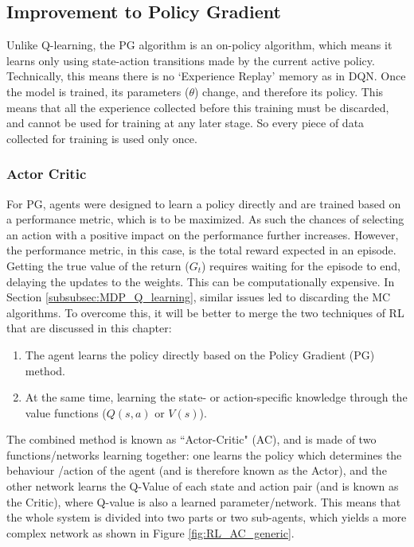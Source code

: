 \subsection{Improvement to Policy Gradient}

Unlike Q-learning, the PG algorithm is an on-policy algorithm, which means it learns only using state-action transitions made by the current active policy. Technically, this means there is no `Experience Replay' memory as in DQN. Once the model is trained, its parameters ($\theta$) change, and therefore its policy. This means that all the experience collected before this training must be discarded, and cannot be used for training at any later stage. So every piece of data collected for training is used only once.

\subsubsection{Actor Critic}
For PG, agents were designed to learn a policy directly and are trained based on a performance metric, which is to be maximized. As such the chances of selecting an action with a positive impact on the performance further increases. However, the performance metric, in this case, is the total reward expected in an episode. Getting the true value of the return ($G_t$) requires waiting for the episode to end, delaying the updates to the weights. This can be computationally expensive. In Section \ref{subsubsec:MDP_Q_learning}, similar issues led to discarding the MC algorithms. To overcome this, it will be better to merge the two techniques of RL that are discussed in this chapter: 

\begin{enumerate}
    \item The agent learns the policy directly based on the Policy Gradient (PG) method.
    \item At the same time, learning the state- or action-specific knowledge through the value functions ($Q(s, a )$ or $V(s)$).
\end{enumerate}

The combined method is known as ``Actor-Critic" (AC), and is made of two functions/networks learning together: one learns the policy which determines the behaviour /action of the agent (and is therefore known as the Actor), and the other network learns the Q-Value of each state and action pair (and is known as the Critic), where Q-value is also a learned parameter/network. This means that the whole system is divided into two parts or two sub-agents, which yields a more complex network as shown in Figure \ref{fig:RL_AC_generic}. 

